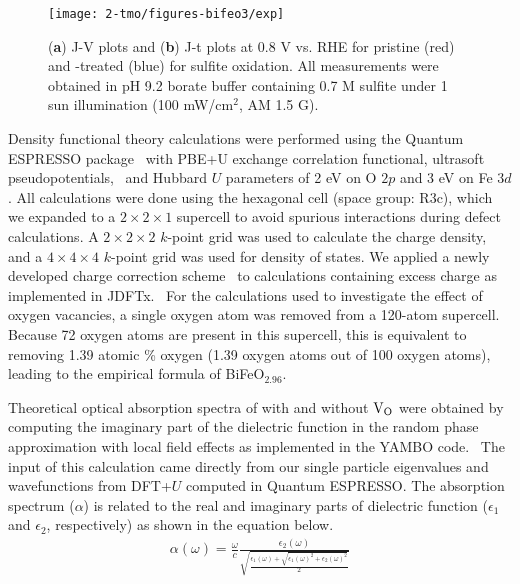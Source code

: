 \begin{figure}
    \centering
    \texttt{[image: 2-tmo/figures-bifeo3/exp]}
    \caption{
    (\textbf{a}) J-V plots and (\textbf{b}) J-t plots at 0.8 V vs. RHE for pristine  (red) and -treated  (blue) for sulfite oxidation. All measurements were obtained in pH 9.2 borate buffer containing 0.7 M sulfite under 1 sun illumination (100 mW/cm$^2$, AM 1.5 G).
    }
    \label{bifeo3:fig:exp}
\end{figure}

Density functional theory calculations were performed using the Quantum ESPRESSO package~\cite{QE1} with PBE+U exchange correlation functional, ultrasoft pseudopotentials,~\cite{gbrv} and Hubbard $U$ parameters of 2 eV on O $2p$ and 3 eV on Fe $3d$. All calculations were done using the hexagonal  cell (space group: R3c), which we expanded to a $2\times 2\times 1$ supercell to avoid spurious interactions during defect calculations. A $2\times 2\times 2$ $k$-point grid was used to calculate the charge density, and a $4\times 4\times 4$ $k$-point grid was used for density of states. We applied a newly developed charge correction scheme~\cite{PING2017JCP} to calculations containing excess charge as implemented in JDFTx.~\cite{JDFTx} For the calculations used to investigate the effect of oxygen vacancies, a single oxygen atom was removed from a 120-atom supercell. Because 72 oxygen atoms are present in this supercell, this is equivalent to removing 1.39 atomic \% oxygen (1.39 oxygen atoms out of 100 oxygen atoms), leading to the empirical formula of BiFeO$_{2.96}$.

Theoretical optical absorption spectra of  with and without $\rm V_O$ were obtained by computing the imaginary part of the dielectric function in the random phase approximation with local field effects as implemented in the YAMBO code.~\cite{YAMBO} The input of this calculation came directly from our single particle eigenvalues and wavefunctions from DFT+$U$ computed in Quantum ESPRESSO. The absorption spectrum ($\alpha$) is related to the real and imaginary parts of dielectric function ($\epsilon_1$ and $\epsilon_2$, respectively) as shown in the equation below.~\cite{jackson1999}
\begin{align}
    \alpha(\omega) = \frac{\omega}{c} \frac{\epsilon_2(\omega)}{\sqrt{\frac{\epsilon_1(\omega) +\sqrt{\epsilon_1(\omega)^2+\epsilon_2(\omega)^2}}{2}}}
    \label{bifeo3:eq:alpha}
\end{align}

